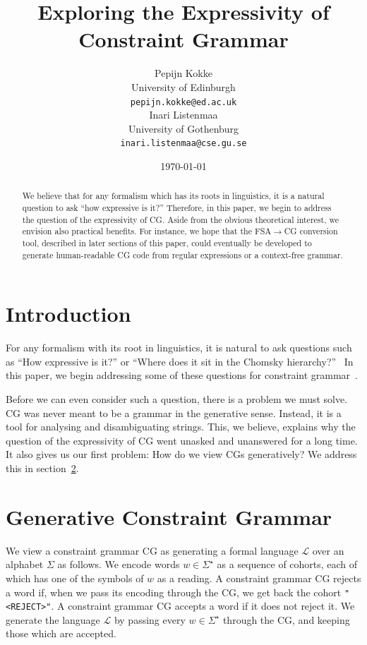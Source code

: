 \documentclass[11pt]{article}
\title{Exploring the Expressivity of Constraint Grammar}
\author{%
  Pepijn Kokke \\
  University of Edinburgh \\
  {\tt pepijn.kokke@ed.ac.uk} \\\And
  Inari Listenmaa \\
  University of Gothenburg \\
  {\tt inari.listenmaa@cse.gu.se} }
\date{\today}
\def\t#1{\texttt{#1}}
\begin{document}
\maketitle

\begin{abstract}
  We believe that for any formalism which has its roots in linguistics, it is a
  natural question to ask ``how expressive is it?'' Therefore, in this paper, we
  begin to address the question of the expressivity of CG.
  Aside from the obvious theoretical interest, we envision also practical
  benefits. For instance, we hope that the FSA$\rightarrow$CG conversion tool, described in
  later sections of this paper, could eventually be developed to generate
  human-readable CG code from regular expressions or a context-free grammar. 
\end{abstract}


\section{Introduction}
For any formalism with its root in linguistics, it is natural to ask questions
such as ``How expressive is it?'' or ``Where does it sit in the Chomsky
hierarchy?''~\cite{chomsky1956hierarchy}
In this paper, we begin addressing some of these questions for constraint
grammar~\cite[CG]{karlsson1995constraint}.

Before we can even consider such a question, there is a problem we must
solve. CG was never meant to be a grammar in the generative sense. Instead, it
is a tool for analysing and disambiguating strings.
This, we believe, explains why the question of the expressivity of CG went
unasked and unanswered for a long time.
It also gives us our first problem: How do we view CGs generatively?
We address this in section~\ref{sec:gencg}.


\section{Generative Constraint Grammar}\label{sec:gencg}
We view a constraint grammar CG as generating a formal language $\mathcal{L}$
over an alphabet $\Sigma$ as follows.
We encode words $w \in \Sigma^\star$ as a sequence of cohorts, each of which has
one of the symbols of $w$ as a reading.
A constraint grammar CG rejects a word if, when we pass its encoding through the
CG, we get back the cohort \t{"<REJECT>"}. A constraint grammar CG accepts a word
if it does not reject it.
We generate the language $\mathcal{L}$ by passing every $w \in \Sigma^\star$
through the CG, and keeping those which are accepted.
\end{document}
